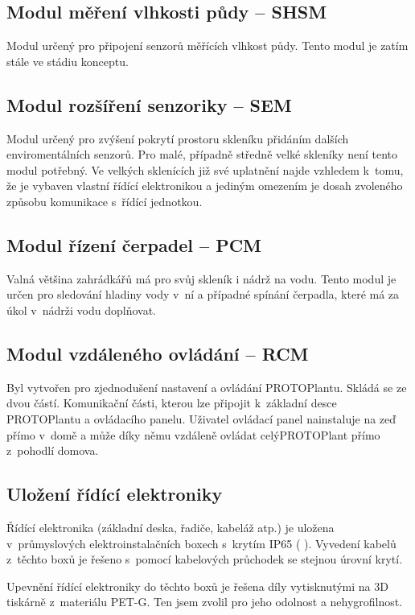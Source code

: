 \subsection{Modul měření vlhkosti půdy -- SHSM}
\label{subsec:SHSM}
Modul určený pro připojení senzorů měřících vlhkost půdy.
Tento modul je zatím stále ve stádiu konceptu.

\subsection{Modul rozšíření senzoriky -- SEM}
\label{subsec:SEM}
Modul určený pro zvýšení pokrytí prostoru skleníku přidáním dalších enviromentálních senzorů.
Pro malé, případně středně velké skleníky není tento modul potřebný. 
Ve velkých sklenících již své uplatnění najde vzhledem k~tomu, že je vybaven vlastní řídící elektronikou a jediným omezením je dosah zvoleného způsobu komunikace s~řídící jednotkou.

\subsection{Modul řízení čerpadel -- PCM}
\label{subsec:PCM}
Valná většina zahrádkářů má pro svůj skleník i nádrž na vodu.
Tento modul je určen pro sledování hladiny vody v~ní a případné spínání čerpadla, které má za úkol v~nádrži vodu doplňovat.

\subsection{Modul vzdáleného ovládání -- RCM}
\label{subsec:RCM}
Byl vytvořen pro zjednodušení nastavení a ovládání PROTOPlantu.
Skládá se ze dvou částí. 
Komunikační části, kterou lze připojit k~základní desce PROTOPlantu a ovládacího panelu. 
Uživatel ovládací panel nainstaluje na zeď přímo v~domě a může díky němu vzdáleně ovládat celýPROTOPlant přímo z~pohodlí domova. 

\subsection{Uložení řídící elektroniky}
Řídící elektronika (základní deska, řadiče, kabeláž atp.) je uložena v~průmyslových elektroinstalačních boxech s~krytím IP65 ( \cite{IP_ratings}).
Vyvedení kabelů z~těchto boxů je řešeno s~pomocí kabelových průchodek se stejnou úrovní krytí.

Upevnění řídící elektroniky do těchto boxů je řešena díly vytisknutými na 3D tiskárně z~materiálu PET-G.
Ten jsem zvolil pro jeho odolnost a nehygrofilnost.

